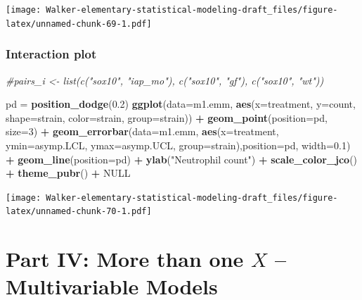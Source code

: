 \documentclass[]{book}
\newenvironment{Shaded}{\begin{snugshade}}{\end{snugshade}}
\newcommand{\KeywordTok}[1]{\textcolor[rgb]{0.13,0.29,0.53}{\textbf{#1}}}
\newcommand{\DataTypeTok}[1]{\textcolor[rgb]{0.13,0.29,0.53}{#1}}
\newcommand{\DecValTok}[1]{\textcolor[rgb]{0.00,0.00,0.81}{#1}}
\newcommand{\FloatTok}[1]{\textcolor[rgb]{0.00,0.00,0.81}{#1}}
\newcommand{\StringTok}[1]{\textcolor[rgb]{0.31,0.60,0.02}{#1}}
\newcommand{\CommentTok}[1]{\textcolor[rgb]{0.56,0.35,0.01}{\textit{#1}}}
\newcommand{\OtherTok}[1]{\textcolor[rgb]{0.56,0.35,0.01}{#1}}
\newcommand{\OperatorTok}[1]{\textcolor[rgb]{0.81,0.36,0.00}{\textbf{#1}}}
\newcommand{\NormalTok}[1]{#1}
\begin{document}
\texttt{[image: Walker-elementary-statistical-modeling-draft\_files/figure-latex/unnamed-chunk-69-1.pdf]}

\subsection{Interaction plot}\label{interaction-plot}

\begin{Shaded}
\begin{Highlighting}[]
\CommentTok{#pairs_i <- list(c("sox10", "iap_mo"), c("sox10", "gf"), c("sox10", "wt"))}

\NormalTok{pd =}\StringTok{ }\KeywordTok{position_dodge}\NormalTok{(}\FloatTok{0.2}\NormalTok{)}
\KeywordTok{ggplot}\NormalTok{(}\DataTypeTok{data=}\NormalTok{m1.emm, }\KeywordTok{aes}\NormalTok{(}\DataTypeTok{x=}\NormalTok{treatment, }\DataTypeTok{y=}\NormalTok{count, }\DataTypeTok{shape=}\NormalTok{strain, }\DataTypeTok{color=}\NormalTok{strain, }\DataTypeTok{group=}\NormalTok{strain)) }\OperatorTok{+}
\StringTok{  }\KeywordTok{geom_point}\NormalTok{(}\DataTypeTok{position=}\NormalTok{pd, }\DataTypeTok{size=}\DecValTok{3}\NormalTok{) }\OperatorTok{+}
\StringTok{  }\KeywordTok{geom_errorbar}\NormalTok{(}\DataTypeTok{data=}\NormalTok{m1.emm, }\KeywordTok{aes}\NormalTok{(}\DataTypeTok{x=}\NormalTok{treatment, }\DataTypeTok{ymin=}\NormalTok{asymp.LCL, }\DataTypeTok{ymax=}\NormalTok{asymp.UCL, }\DataTypeTok{group=}\NormalTok{strain),}\DataTypeTok{position=}\NormalTok{pd, }\DataTypeTok{width=}\FloatTok{0.1}\NormalTok{) }\OperatorTok{+}
\StringTok{  }\KeywordTok{geom_line}\NormalTok{(}\DataTypeTok{position=}\NormalTok{pd) }\OperatorTok{+}
\StringTok{  }\KeywordTok{ylab}\NormalTok{(}\StringTok{"Neutrophil count"}\NormalTok{) }\OperatorTok{+}
\StringTok{  }\KeywordTok{scale_color_jco}\NormalTok{() }\OperatorTok{+}
\StringTok{  }\KeywordTok{theme_pubr}\NormalTok{() }\OperatorTok{+}
\StringTok{  }\OtherTok{NULL}
\end{Highlighting}
\end{Shaded}

\texttt{[image: Walker-elementary-statistical-modeling-draft\_files/figure-latex/unnamed-chunk-70-1.pdf]}

\chapter*{\texorpdfstring{Part IV: More than one \(X\) -- Multivariable
Models}{Part IV: More than one X -- Multivariable Models}}\label{part-iv-more-than-one-x-multivariable-models}
\end{document}
